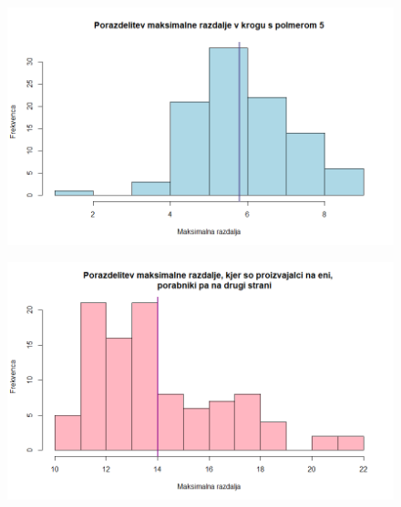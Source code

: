 \documentclass[a4paper, 11pt]{article}
\begin{document}
\begin{figure}[h!]
    \centering
    \includegraphics[scale=0.5]{porazdelitev_v_krogu.png}
\end{figure}

\clearpage
\begin{figure}[t!]
    \centering
    \includegraphics[scale=0.5]{porazdelitev_strani.png}
\end{figure}
\mbox{}
\end{document}
